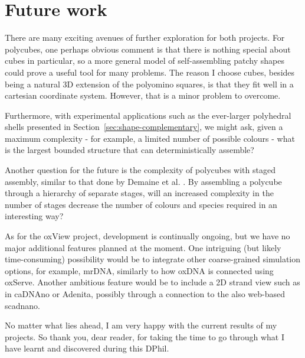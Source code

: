 \section{Future work}

There are many exciting avenues of further exploration for both projects. For polycubes, one perhaps obvious comment is that there is nothing special about cubes in particular, so a more general model of self-assembling patchy shapes could prove a useful tool for many problems. The reason I choose cubes, besides being a natural 3D extension of the polyomino squares, is that they fit well in a cartesian coordinate system. However, that is a minor problem to overcome.

Furthermore, with experimental applications such as the ever-larger polyhedral shells presented in Section~\ref{sec:shape-complementary}, we might ask, given a maximum complexity - for example, a limited number of possible colours - what is the largest bounded structure that can deterministically assemble?

Another question for the future is the complexity of polycubes with staged assembly, similar to that done by Demaine et al. \cite{demaine2008staged}. By assembling a polycube through a hierarchy of separate stages, will an increased complexity in the number of stages decrease the number of colours and species required in an interesting way?

As for the oxView project, development is continually ongoing, but we have no major additional features planned at the moment. One intriguing (but likely time-consuming) possibility would be to integrate other coarse-grained simulation options, for example, mrDNA, similarly to how oxDNA is connected using oxServe. Another ambitious feature would be to include a 2D strand view such as in caDNAno or Adenita, possibly through a connection to the also web-based scadnano.

No matter what lies ahead, I am very happy with the current results of my projects. So thank you, dear reader, for taking the time to go through what I have learnt and discovered during this DPhil.